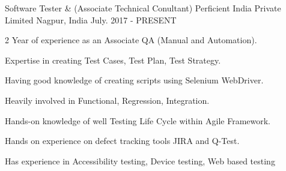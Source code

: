 

\begin{cventries}

  \cventry
    {Software Tester \& (Associate Technical Conultant)} %
    {Perficient India Private Limited} %
    {Nagpur, India} %
    {July. 2017 - PRESENT} %
    {
      \begin{cvitems} %
        \item {2 Year of experience as an Associate QA (Manual and Automation).}
        \item {Expertise in creating Test Cases, Test Plan, Test Strategy.}
        \item {Having good knowledge of creating scripts using Selenium WebDriver.}
        \item {Heavily involved in Functional, Regression, Integration.}
        \item {Hands-on knowledge of well Testing Life Cycle within Agile Framework.}
        \item {Hands on experience on defect tracking tools JIRA and Q-Test.}
        \item {Has experience in Accessibility testing, Device testing, Web based testing}
      \end{cvitems}
    }

\end{cventries}
